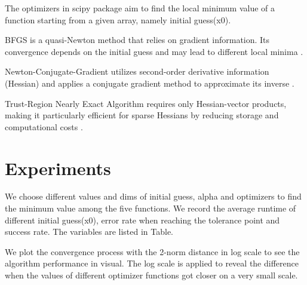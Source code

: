 \documentclass[12pt]{article}
\begin{document}
The optimizers in scipy package aim to find the local minimum value of a function starting from a given array, namely initial guess(x0).  \cite{scipy} 

BFGS is a quasi-Newton method that relies on gradient information. Its convergence depends on the initial guess and may lead to different local minima \cite{scipybfgs}.

Newton-Conjugate-Gradient utilizes second-order derivative information (Hessian) and applies a conjugate gradient method to approximate its inverse \cite{scipynewton}.

Trust-Region Nearly Exact Algorithm requires only Hessian-vector products, making it particularly efficient for sparse Hessians by reducing storage and computational costs \cite{scipytrust}.

\section{Experiments}


We choose different values and dims of initial guess, alpha and optimizers to find the minimum value among the five functions. We record the average runtime of different initial guess(x0), error rate when reaching the tolerance point and success rate. The variables are listed in Table. %

\begin{table}[h!]
\label{table:rule}
\centering
\caption{Variants for experiment setups; x0 means the initial guess}
\end{table}

We plot the convergence process with the 2-norm distance in log scale to see the algorithm performance in visual. The log scale is applied to reveal the difference when the values of different optimizer functions got closer on a very small scale. 
\end{document}
